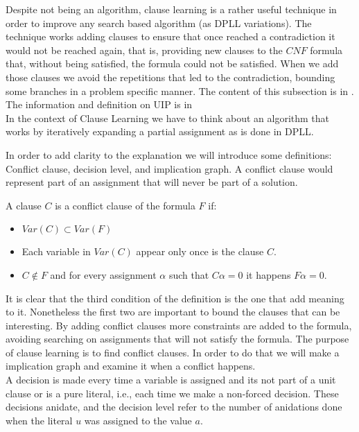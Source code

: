 Despite not being an algorithm, clause learning is a rather useful technique in order to improve any search based algorithm (as DPLL variations).  The technique works adding clauses to ensure that once reached a contradiction it would not be reached again, that is, providing new clauses to the $CNF$ formula that, without being satisfied, the formula could not be satisfied. When we add those clauses we avoid the repetitions that led to the contradiction, bounding some branches in a problem specific manner.  The content of this subsection is in \cite{tichy2006clause}. The information and definition on UIP is in \cite{zhang2001efficient} \\

In the context of Clause Learning we have to think about an algorithm that works by iteratively expanding a partial assignment as is done in DPLL.


In order to add clarity to the explanation we will introduce some definitions: Conflict clause, decision level, and implication graph. A conflict clause would represent part of an assignment that will never be part of a solution.  

\begin{definition}
  A clause $C$ is a conflict clause of the formula $F$ if:
  \begin{itemize}
  \item $Var(C) \subset Var(F)$
  \item Each variable in $Var(C)$ appear only once is the clause $C$.  
  \item $C \not\in F$ and for every assignment $\alpha$ such that $C\alpha = 0$ it happens $F\alpha = 0$.
  \end{itemize}
\end{definition}

It is clear that the third condition of the definition is the one that add meaning to it. Nonetheless the first two are important to bound the clauses that can be interesting. By adding conflict clauses more constraints are added to the formula, avoiding searching on assignments that will not satisfy the formula. The purpose of clause learning is to find conflict clauses. In order to do that we will make a implication graph and examine it when a conflict happens.\\

A decision is made every time a variable is assigned and its not part of a unit clause or is a pure literal, i.e., each time we make a non-forced decision. These decisions anidate, and the decision level refer to the number of anidations done when the literal $u$ was assigned to the value $a$.\\

